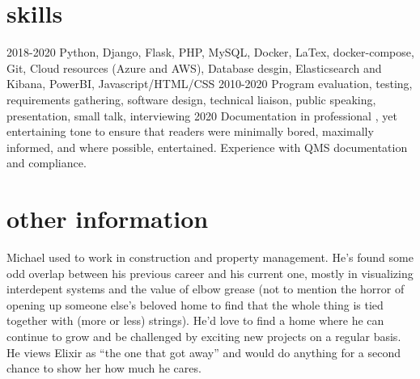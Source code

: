 \documentclass[]{twentysecondcv}
\begin{document}
\section{skills}
	\begin{twentyshort}
	\twentyitemshort
	{2018-2020}
	{Python, Django, Flask, PHP, MySQL, Docker, LaTex, docker-compose, Git, Cloud resources (Azure and AWS), Database desgin, Elasticsearch and Kibana, PowerBI, Javascript/HTML/CSS}
	\twentyitemshort
	{2010-2020}
	{Program evaluation, testing, requirements gathering, software design, technical liaison, public speaking, presentation, small talk, interviewing}
	\twentyitemshort
	{2020}
	{Documentation in  professional , yet entertaining tone to ensure that readers were minimally bored, maximally informed, and where possible, entertained. Experience with QMS documentation and compliance.}
	\end{twentyshort}
\section{other information}
Michael used to work in construction and property management. He's found some odd overlap between his previous career and his current one, mostly in visualizing interdepent systems and the value of elbow grease (not to mention the horror of opening up someone else's beloved home to find that the whole thing is tied together with (more or less) strings). He'd love to find a home where he can continue to grow and be challenged by exciting new projects on a regular basis.
He views Elixir as ``the one that got away'' and would do anything for a second chance to show her how much he cares.

\end{document}
